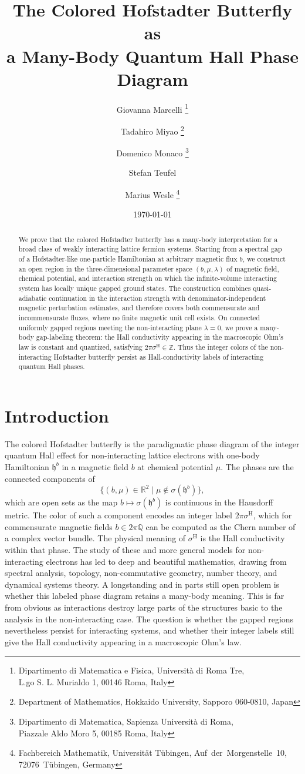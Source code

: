 \documentclass[a4paper]{article}
\title{The Colored Hofstadter Butterfly as\\ a Many-Body Quantum Hall Phase Diagram}
\author{
    Giovanna Marcelli%
    \texorpdfstring{%
        \footnote{%
            \parbox[t]{.8\textwidth}{
                \foreignlanguage{italian}{Dipartimento di Matematica e Fisica, Università di Roma Tre,\\ L.go S. L. Murialdo 1, 00146 Roma,} Italy
            }
        }
    }{}%
    \and Tadahiro Miyao%
    \texorpdfstring{%
        \footnote{%
            \parbox[t]{.8\textwidth}{
                \foreignlanguage{italian}{Department of Mathematics,  Hokkaido University,
                 Sapporo 060-0810,} Japan
            }
        }
    }{}%
    \and Domenico Monaco%
    \texorpdfstring{%
        \footnote{%
            \parbox[t]{.8\textwidth}{
                \foreignlanguage{italian}{Dipartimento di Matematica, 
                Sapienza Università di Roma,\\ Piazzale Aldo Moro 5, 00185 Roma, Italy}
            }
        }
    }{}%
    \and Stefan Teufel%
    \texorpdfstring{%
        \footnotemark[4]%
    }{}%
    \and
     Marius Wesle%
    \texorpdfstring{\footnote{\parbox[t]{.8\textwidth}{
                \foreignlanguage{ngerman}{Fachbereich Mathematik, %
                Universität Tübingen,
                Auf~der~Morgenstelle~10,\\ 72076~Tübingen,} Germany
            }
        }
    }{}%
}
\date{\today}
\newcommand{\Q}{\mathbb{Q}}
\newcommand{\R}{\mathbb{R}}
\theoremstyle{plain}
\theoremstyle{definition}
\theoremstyle{remark}
\renewcommand{\(}{\left(}
\renewcommand{\)}{\right)}
\begin{document}
\maketitle

\begin{abstract}

 
We prove that the colored Hofstadter butterfly has a many-body interpretation for a broad class of weakly interacting lattice fermion systems. Starting from a spectral gap of a Hofstadter-like one-particle Hamiltonian at arbitrary magnetic flux $b$, we construct an open region in the three-dimensional parameter space $(b,\mu,\lambda)$ of magnetic field, chemical potential, and interaction strength on which the infinite-volume interacting system has locally unique gapped ground states. The construction combines quasi-adiabatic continuation in the interaction strength with denominator-independent magnetic perturbation estimates, and therefore covers both commensurate and incommensurate fluxes, where no finite magnetic unit cell exists. On connected uniformly gapped regions meeting the non-interacting plane $\lambda=0$, we prove a many-body gap-labeling theorem: the Hall conductivity appearing in the macroscopic Ohm's law is constant and quantized, satisfying $2\pi\sigma^{\mathrm H}\in\mathbb Z$. Thus the integer colors of the non-interacting Hofstadter butterfly persist as Hall-conductivity labels of interacting quantum Hall phases.
\end{abstract}

\section{Introduction}


 

The colored Hofstadter butterfly is the paradigmatic phase diagram of the integer quantum Hall effect for non-interacting lattice electrons with one-body Hamiltonian $\mathfrak{h}^b$ in a magnetic field $b$ at chemical potential $\mu$. The phases are the connected components of
\[
\{(b,\mu)\in\R^2\;|\; \mu\notin\sigma(\mathfrak h^b)\},
\]
which are open sets as the map $b\mapsto \sigma(\mathfrak{h}^b)$ is  continuous in the Hausdorff metric.
The color of such a component encodes an integer label $2\pi\sigma^{\mathrm H}$, which for commensurate magnetic fields $b\in2\pi\Q$ can be computed as the Chern number of a complex vector bundle. The physical meaning of 
$\sigma^\mathrm{H}$ is the Hall conductivity within that phase. The study of these and more general models for non-interacting electrons has led to deep and beautiful mathematics, drawing from spectral analysis, topology, non-commutative geometry, number theory, and dynamical systems theory.
A longstanding and in parts still open problem is whether this  labeled phase diagram retains a many-body meaning.
This is far from obvious   as  interactions destroy large parts of the structures basic to the analysis in the non-interacting case.
The question is whether the gapped regions nevertheless persist for interacting systems, and whether their integer labels still give the Hall conductivity appearing in a macroscopic Ohm's law.
 
\end{document}
